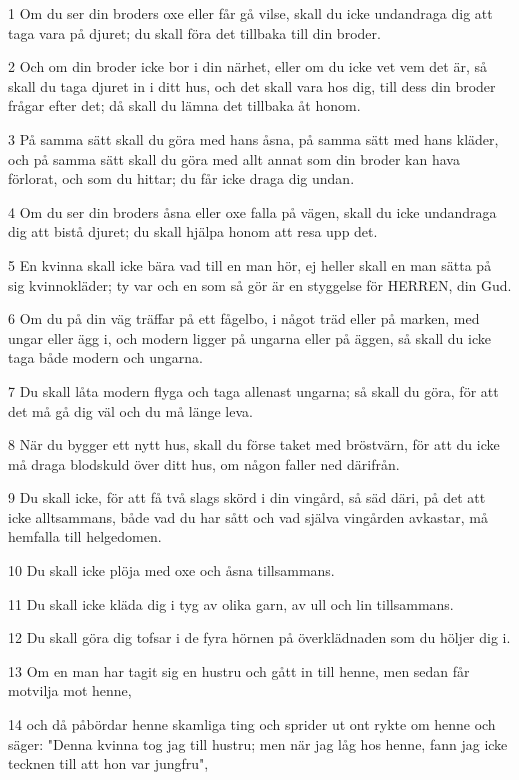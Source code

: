 \par 1 Om du ser din broders oxe eller får gå vilse, skall du icke undandraga dig att taga vara på djuret; du skall föra det tillbaka till din broder.
\par 2 Och om din broder icke bor i din närhet, eller om du icke vet vem det är, så skall du taga djuret in i ditt hus, och det skall vara hos dig, till dess din broder frågar efter det; då skall du lämna det tillbaka åt honom.
\par 3 På samma sätt skall du göra med hans åsna, på samma sätt med hans kläder, och på samma sätt skall du göra med allt annat som din broder kan hava förlorat, och som du hittar; du får icke draga dig undan.
\par 4 Om du ser din broders åsna eller oxe falla på vägen, skall du icke undandraga dig att bistå djuret; du skall hjälpa honom att resa upp det.
\par 5 En kvinna skall icke bära vad till en man hör, ej heller skall en man sätta på sig kvinnokläder; ty var och en som så gör är en styggelse för HERREN, din Gud.
\par 6 Om du på din väg träffar på ett fågelbo, i något träd eller på marken, med ungar eller ägg i, och modern ligger på ungarna eller på äggen, så skall du icke taga både modern och ungarna.
\par 7 Du skall låta modern flyga och taga allenast ungarna; så skall du göra, för att det må gå dig väl och du må länge leva.
\par 8 När du bygger ett nytt hus, skall du förse taket med bröstvärn, för att du icke må draga blodskuld över ditt hus, om någon faller ned därifrån.
\par 9 Du skall icke, för att få två slags skörd i din vingård, så säd däri, på det att icke alltsammans, både vad du har sått och vad själva vingården avkastar, må hemfalla till helgedomen.
\par 10 Du skall icke plöja med oxe och åsna tillsammans.
\par 11 Du skall icke kläda dig i tyg av olika garn, av ull och lin tillsammans.
\par 12 Du skall göra dig tofsar i de fyra hörnen på överklädnaden som du höljer dig i.
\par 13 Om en man har tagit sig en hustru och gått in till henne, men sedan får motvilja mot henne,
\par 14 och då påbördar henne skamliga ting och sprider ut ont rykte om henne och säger: "Denna kvinna tog jag till hustru; men när jag låg hos henne, fann jag icke tecknen till att hon var jungfru",
